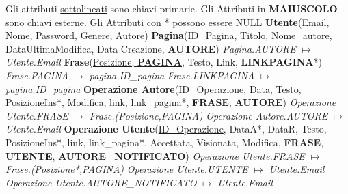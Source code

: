 Gli attributi \underline{sottolineati} sono chiavi primarie.\newline
Gli Attributi in \textbf{MAIUSCOLO} sono chiavi esterne.\newline
Gli Attributi con * possono essere NULL
\newline\newline
\textbf{Utente}(\underline{Email}, Nome, Password, Genere, Autore)\newline\newline
\textbf{Pagina}(\underline{ID\_Pagina}, Titolo, Nome\_autore, DataUltimaModifica, Data Creazione, \textbf{AUTORE})\newline
\textit{Pagina.AUTORE} $\longmapsto$ \textit{Utente.Email}
\newline\newline
\textbf{Frase}(\underline{Posizione, \textbf{PAGINA}}, Testo, Link, \textbf{LINKPAGINA}*)
\newline
\textit{Frase.PAGINA} $\longmapsto$ \textit{pagina.ID\_pagina}
\newline
\textit{Frase.LINKPAGINA} $\longmapsto$ \textit{pagina.ID\_pagina}
\newline\newline
\textbf{Operazione Autore}(\underline{ID\_Operazione}, Data, Testo, PosizioneIns*, Modifica, link, link\_pagina*, \textbf{FRASE}, \textbf{AUTORE})\newline
\textit{Operazione Utente.FRASE} $\longmapsto$ \textit{Frase.(Posizione,PAGINA)}\newline
\textit{Operazione Autore.AUTORE} $\longmapsto$ \textit{Utente.Email}
\newline\newline
\textbf{Operazione Utente}(\underline{ID\_Operazione}, DataA*, DataR, Testo, PosizioneIns*, link, link\_pagina*, Accettata, Visionata, Modifica, \textbf{FRASE}, \textbf{UTENTE}, \textbf{AUTORE\_NOTIFICATO})\newline
\textit{Operazione Utente.FRASE} $\longmapsto$ \textit{Frase.(Posizione*,PAGINA)}\newline
\textit{Operazione Utente.UTENTE} $\longmapsto$ \textit{Utente.Email}
\newline
\textit{Operazione Utente.AUTORE\_NOTIFICATO} $\longmapsto$ \textit{Utente.Email}
\newpage